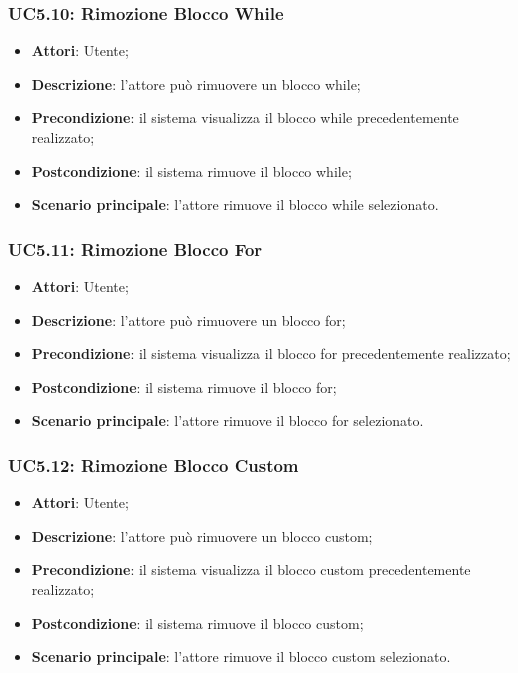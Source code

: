 \subsubsection{UC5.10: Rimozione Blocco While}
\label{UC5.10}
\begin{itemize}
	\item \textbf{Attori}: Utente;
	\item \textbf{Descrizione}: l'attore può rimuovere un blocco while;
	\item \textbf{Precondizione}: il sistema visualizza il blocco while precedentemente realizzato;
	\item \textbf{Postcondizione}: il sistema rimuove il blocco while;
	\item \textbf{Scenario principale}: l'attore rimuove il blocco while selezionato.
\end{itemize}

\subsubsection{UC5.11: Rimozione Blocco For}
\label{UC5.11}
\begin{itemize}
	\item \textbf{Attori}: Utente;
	\item \textbf{Descrizione}: l'attore può rimuovere un blocco for;
	\item \textbf{Precondizione}: il sistema visualizza il blocco for precedentemente realizzato;
	\item \textbf{Postcondizione}: il sistema rimuove il blocco for;
	\item \textbf{Scenario principale}: l'attore rimuove il blocco for selezionato.
\end{itemize}

\subsubsection{UC5.12: Rimozione Blocco Custom}
\label{UC5.12}
\begin{itemize}
	\item \textbf{Attori}: Utente;
	\item \textbf{Descrizione}: l'attore può rimuovere un blocco custom;
	\item \textbf{Precondizione}: il sistema visualizza il blocco custom precedentemente realizzato;
	\item \textbf{Postcondizione}: il sistema rimuove il blocco custom;
	\item \textbf{Scenario principale}: l'attore rimuove il blocco custom selezionato.
\end{itemize}


